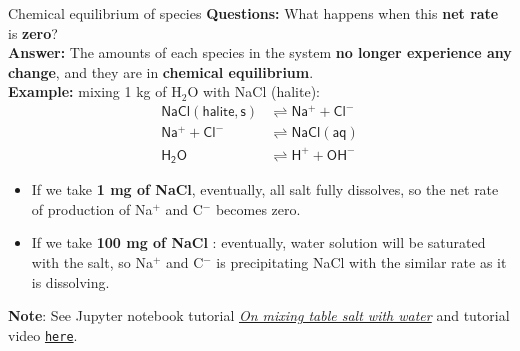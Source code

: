 \begin{frame}{Chemical equilibrium of species}
%
\alert{\textbf{Questions:}} What happens when this \textbf{net rate} is \alert{\textbf{zero}}? \\\textbf{Answer:} The amounts of each species in the system \textbf{no longer experience
any change}, and they are in \alert{\textbf{chemical equilibrium}}. \\[5pt]
%
\pause
\alert{\textbf{Example:}}
mixing 1 kg of H$_{2}$O with NaCl (halite):\\[-20pt] 
%
\begin{align*}
\mathsf{NaCl(halite, s)} & \rightleftharpoons\mathsf{Na^{+}+Cl^{-}}\\[-1pt]
\mathsf{Na^{+}+Cl^{-}} & \rightleftharpoons\mathsf{NaCl(aq)}\\[-1pt]
\mathsf{H_{2}O} & \rightleftharpoons\mathsf{H^{+}+OH^{-}}
\end{align*}
%
\vskip -5pt
\pause
\begin{itemize}
%
\item If we take \alert{\textbf{1 mg of NaCl}}, eventually, all salt fully dissolves, so the net rate of production of Na$^{+}$ and C$^-$ becomes zero.
%
\pause
\item If we take \alert{\textbf{100 mg of NaCl }}: eventually, water solution will be saturated with the salt, so Na$^{+}$ and C$^-$  is precipitating NaCl with the similar rate as it is dissolving.
\end{itemize}
\pause
\alert{\textbf{Note}}: See Jupyter notebook tutorial \href{https://github.com/mtsveta/reaktoro-jupyter/blob/geofluids-examples/tutorial/eq.sodium-chloride-solubility-in-water.ipynb}{\textcolor{indigo(dye)}{\it On mixing table salt with water}} and tutorial video \href{https://polybox.ethz.ch/index.php/s/qStBnxUnry648U5}{\textcolor{indigo(dye)}{\tt here}}.

\end{frame}
%
